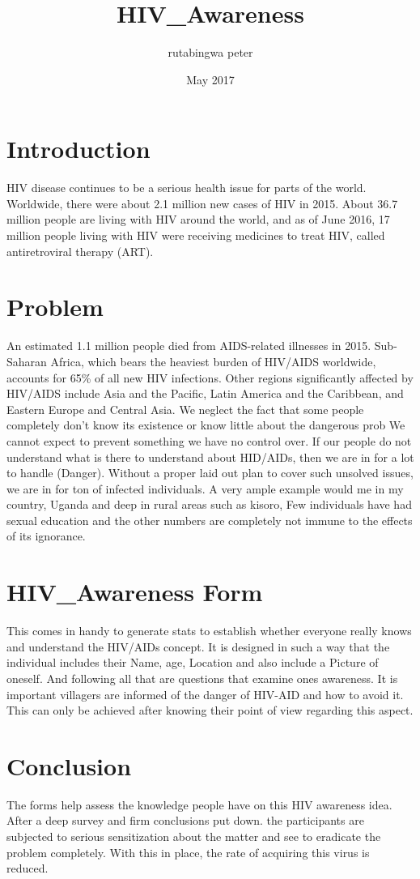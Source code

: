 \documentclass{article}
\title{HIV\_Awareness}
\author{rutabingwa peter }
\date{May 2017}
\begin{document}
\maketitle


\section{Introduction}
HIV disease continues to be a serious health issue for parts of the world. Worldwide, there were about 2.1 million new cases of HIV in 2015. About 36.7 million people are living with HIV around the world, and as of June 2016, 17 million people living with HIV were receiving medicines to treat HIV, called antiretroviral therapy (ART). 

\section{Problem}
An estimated 1.1 million people died from AIDS-related illnesses in 2015. Sub-Saharan Africa, which bears the heaviest burden of HIV/AIDS worldwide, accounts for 65\% of all new HIV infections. Other regions significantly affected by HIV/AIDS include Asia and the Pacific, Latin America and the Caribbean, and Eastern Europe and Central Asia. We neglect the fact that some people completely don’t know its existence or know little about the dangerous prob
We cannot expect to prevent something we have no control over. If our people do not understand what is there to understand about HID/AIDs, then we are in for a lot to handle (Danger). Without a proper laid out plan to cover such unsolved issues, we are in for ton of infected individuals. A very ample example would me in my country, Uganda and deep in rural areas such as kisoro, Few individuals have had sexual education and the other numbers are completely not immune to the effects of its ignorance. 
\section{HIV\_Awareness Form}
This comes in handy to generate stats to establish whether everyone really knows and understand the HIV/AIDs concept. It is designed in such a way that the individual includes their Name, age, Location and also include a Picture of oneself. And following all that are questions that examine ones awareness. It is important villagers are informed of the danger of HIV-AID and how to avoid it. This can only be achieved after knowing their point of view regarding this aspect.

 
\section{Conclusion}

The forms help assess the knowledge people have on this HIV awareness idea. After a deep survey and firm conclusions put down. 
the participants are subjected to serious sensitization about the matter and see to eradicate the problem completely. With this in place, the rate of acquiring this virus is reduced.
\end{document}
